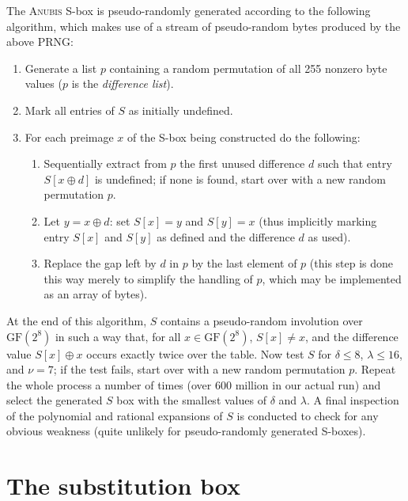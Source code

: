 \documentclass{llncs}
\newcommand{\GF}{\mathrm{GF}}
\begin{document}
The \textsc{Anubis} S-box is pseudo-randomly generated according to
the following algorithm, which makes use of a stream
of pseudo-random bytes produced by the above PRNG:
\begin{enumerate}
\item Generate a list $p$ containing a random permutation
of all 255 nonzero byte values ($p$ is the \emph{difference list}).
\item Mark all entries of $S$ as initially undefined.
\item For each preimage $x$ of the S-box being constructed do the following:
\begin{enumerate}
    \item Sequentially extract from $p$ the first unused difference $d$
        such that entry $S[x \oplus d]$ is undefined; if none is found,
        start over with a new random permutation $p$.
    \item Let $y = x \oplus d$: set $S[x] = y$ and $S[y] = x$
        (thus implicitly marking entry $S[x]$ and $S[y]$ as defined and
        the difference $d$ as used).
    \item Replace the gap left by $d$ in $p$ by the last element of $p$
        (this step is done this way merely to simplify the handling
        of $p$, which may be implemented as an array of bytes).
\end{enumerate}
\end{enumerate}
At the end of this algorithm, $S$ contains a pseudo-random involution
over $\GF(2^8)$ in such a way that, for all $x \in \GF(2^8)$,
$S[x] \neq x$, and the difference value $S[x] \oplus x$ occurs exactly
twice over the table. Now test $S$ for $\delta \leqslant 8$,
$\lambda \leqslant 16$, and $\nu = 7$; if the test fails, start over
with a new random permutation $p$. Repeat the whole process a number
of times (over 600 million in our actual run) and select the generated
$S$ box with the smallest values of $\delta$ and $\lambda$. A final
inspection of the polynomial and rational expansions of $S$ is conducted
to check for any obvious weakness (quite unlikely for pseudo-randomly
generated S-boxes).

\section{The substitution box}\label{sbox-def}
\end{document}
